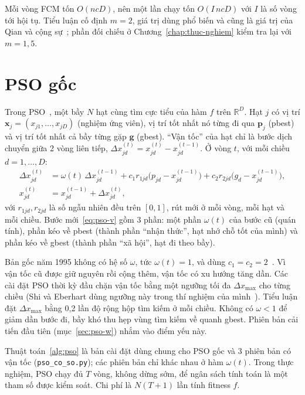 Mỗi vòng FCM tốn $O(ncD)$, nên một lần chạy tốn $O(I\,ncD)$ với $I$ là số vòng tới hội tụ. Tiểu luận cố định $m = 2$, giá
trị dùng phổ biến và cũng là giá trị của Qian và cộng sự~\cite{qian2022psofcm}; phần đối chiếu ở Chương~\ref{chap:thuc-nghiem}
kiểm tra lại với $m = 1{,}5$.

\section{PSO gốc}
\label{sec:pso-goc}

Trong PSO~\cite{kennedy1995pso}, một bầy $N$ hạt cùng tìm cực tiểu của hàm $f$ trên $\mathbb{R}^{D}$. Hạt $j$ có vị trí
$\mathbf{x}_j = (x_{j1}, \dots, x_{jD})$ (nghiệm ứng viên), vị trí tốt nhất nó từng đi qua $\mathbf{p}_j$ (pbest) và vị trí tốt
nhất cả bầy từng gặp $\mathbf{g}$ (gbest). ``Vận tốc'' của hạt chỉ là bước dịch chuyển giữa 2 vòng liên tiếp,
$\Delta x_{jd}^{(t)} = x_{jd}^{(t)} - x_{jd}^{(t-1)}$. Ở vòng $t$, với mỗi chiều $d = 1, \dots, D$:
\begin{align}
  \Delta x_{jd}^{(t)} &= \omega(t)\, \Delta x_{jd}^{(t-1)}
     + c_1 r_{1jd} \big(p_{jd} - x_{jd}^{(t-1)}\big)
     + c_2 r_{2jd} \big(g_{d} - x_{jd}^{(t-1)}\big), \label{eq:pso-v}\\
  x_{jd}^{(t)} &= x_{jd}^{(t-1)} + \Delta x_{jd}^{(t)}, \label{eq:pso-x}
\end{align}
với $r_{1jd}, r_{2jd}$ là số ngẫu nhiên đều trên $[0, 1]$, rút mới ở mỗi vòng, mỗi hạt và mỗi chiều. Bước mới~\eqref{eq:pso-v}
gồm 3 phần: một phần $\omega(t)$ của bước cũ (quán tính), phần kéo về pbest (thành phần ``nhận thức'', hạt nhớ chỗ tốt của
mình) và phần kéo về gbest (thành phần ``xã hội'', hạt đi theo bầy).

Bản gốc năm 1995 không có hệ số $\omega$, tức $\omega(t) = 1$, và dùng $c_1 = c_2 = 2$~\cite{kennedy1995pso}. Vì vận tốc
cũ được giữ nguyên rồi cộng thêm, vận tốc có xu hướng tăng dần. Các cài đặt PSO thời kỳ đầu chặn vận tốc bằng một ngưỡng
tối đa $\Delta x_{\max}$ cho từng chiều (Shi và Eberhart dùng ngưỡng này trong thí nghiệm của mình~\cite{shi1998inertia}).
Tiểu luận đặt $\Delta x_{\max}$ bằng 0,2 lần độ rộng hộp tìm kiếm ở mỗi chiều. Không có $\omega < 1$ để giảm dần bước đi, bầy khó
thu hẹp vùng tìm kiếm về quanh gbest. Phiên bản cải tiến đầu tiên (mục~\ref{sec:pso-w}) nhắm vào điểm yếu này.

Thuật toán~\ref{alg:pso} là bản cài đặt dùng chung cho PSO gốc và 3 phiên bản có vận tốc (\texttt{pso\_co\_so.py});
các phiên bản chỉ khác nhau ở hàm $\omega(t)$. Trong thực nghiệm, PSO chạy đủ $T$ vòng, không dừng sớm, để ngân sách tính
toán là một tham số được kiểm soát. Chi phí là $N(T + 1)$ lần tính fitness $f$.

